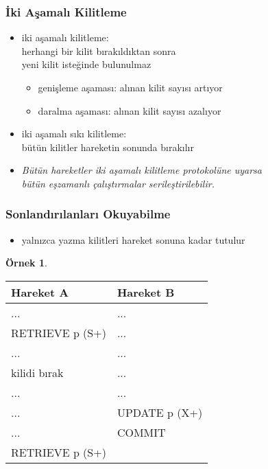 \documentclass[dvipsnames]{beamer}
\theoremstyle{definition}
\theoremstyle{example}
\newtheorem{ornek}[theorem]{Örnek}
\theoremstyle{plain}
\begin{document}
\begin{frame}
  \frametitle{İki Aşamalı Kilitleme}

  \begin{itemize}
    \item \alert{iki aşamalı kilitleme}:\\
      herhangi bir kilit bırakıldıktan sonra\\
      yeni kilit isteğinde bulunulmaz
    \begin{itemize}
      \item genişleme aşaması: alınan kilit sayısı artıyor
      \item daralma aşaması: alınan kilit sayısı azalıyor
    \end{itemize}

    \pause
    \item \alert{iki aşamalı sıkı kilitleme}:\\
      bütün kilitler hareketin sonunda bırakılır

    \pause
    \medskip
    \item \emph{Bütün hareketler iki aşamalı kilitleme protokolüne uyarsa\\
      bütün eşzamanlı çalıştırmalar serileştirilebilir.}
  \end{itemize}
\end{frame}

\begin{frame}[fragile]
  \frametitle{Sonlandırılanları Okuyabilme}

  \begin{itemize}
    \item yalnızca yazma kilitleri hareket sonuna kadar tutulur
  \end{itemize}

  \begin{ornek}
    \begin{table}
      \begin{tabular}{ll}
Hareket A       & Hareket B    \\\hline
...             & ...          \\\pause
RETRIEVE p (S+) & ...          \\\pause
...             & ...          \\
kilidi bırak    & ...          \\\pause
...             & ...          \\
...             & UPDATE p (X+)\\
...             & COMMIT       \\\pause
RETRIEVE p (S+) &
      \end{tabular}
    \end{table}
  \end{ornek}
\end{frame}
\end{document}
